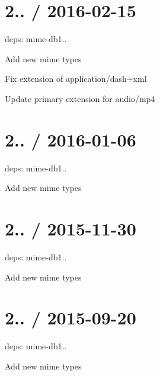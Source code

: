 \section*{2.. / 2016-\/02-\/15 }


\begin{DoxyItemize}
\item deps\+: mime-\/db1..
\begin{DoxyItemize}
\item Add new mime types
\item Fix extension of {\ttfamily application/dash+xml}
\item Update primary extension for {\ttfamily audio/mp4}
\end{DoxyItemize}
\end{DoxyItemize}

\section*{2.. / 2016-\/01-\/06 }


\begin{DoxyItemize}
\item deps\+: mime-\/db1..
\begin{DoxyItemize}
\item Add new mime types
\end{DoxyItemize}
\end{DoxyItemize}

\section*{2.. / 2015-\/11-\/30 }


\begin{DoxyItemize}
\item deps\+: mime-\/db1..
\begin{DoxyItemize}
\item Add new mime types
\end{DoxyItemize}
\end{DoxyItemize}

\section*{2.. / 2015-\/09-\/20 }


\begin{DoxyItemize}
\item deps\+: mime-\/db1..
\begin{DoxyItemize}
\item Add new mime types
\end{DoxyItemize}
\end{DoxyItemize}

